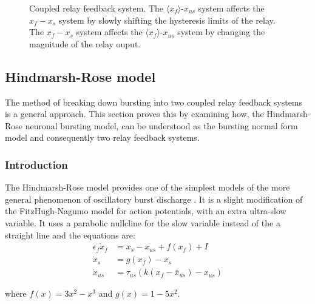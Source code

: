 \documentclass[a4paper, 12pt]{article}
\begin{document}
\begin{figure}
{
}
\caption{Coupled relay feedback system. The $\langle x_f \rangle$-$x_{us}$ system affects the $x_f-x_s$ system by slowly shifting the hysteresis limits of the relay. The $x_f-x_s$ system affects the $\langle x_f \rangle$-$x_{us}$ system by changing the magnitude of the relay ouput.}
\label{fig:bursting_step4}
\end{figure}


\FloatBarrier
\subsection{Hindmarsh-Rose model}
The method of breaking down bursting into two coupled relay feedback systems is a general approach. This section proves this by examining how, the Hindmarsh-Rose neuronal bursting model, can be understood as the bursting normal form model and consequently two relay feedback systems. 
\subsubsection{Introduction}
The Hindmarsh-Rose model provides one of the simplest models of the more general phenomenon of oscillatory burst discharge \cite{hindmarsh}. It is a slight modification of the FitzHugh-Nagumo model for action potentials, with an extra ultra-slow variable. It uses a parabolic nullcline for the slow variable instead of the a straight line and the equations are:
\begin{align}
\epsilon_f\dot{x}_f &= x_s -x_{us} + f(x_f) + I \\
\dot{x}_s &= g(x_f) - x_s\\
\dot{x}_{us} &= \tau_{us}\left(k(x_f-\bar{x}_{us}) - x_{us}\right)
\end{align}
\begin{center}where  $f(x) = 3x^2 - x^3$ and $g(x) = 1 - 5x^2$. \end{center}
\end{document}

